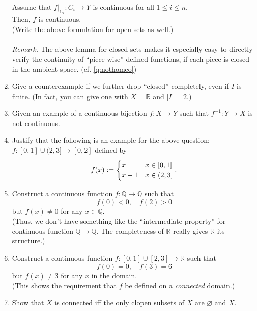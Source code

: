 \documentclass[12pt]{article}
\theoremstyle{definition}
\numberwithin{thm}{section}
\let\emptyset\varnothing
\begin{document}
\begin{enumerate}
	Assume that $f|_{C_i}:C_i \to Y$ is continuous for all $1 \le i \le n.$\\
	Then, $f$ is continuous.\\
	(Write the above formulation for open sets as well.)\\~\\
	\emph{Remark.} The above lemma for closed sets makes it especially easy to directly verify the continuity of ``piece-wise'' defined functions, if each piece is closed in the ambient space. (cf. \ref{q:nothomeo})
	\item Give a counterexample if we further drop ``closed'' completely, even if $I$ is finite. (In fact, you can give one with $X = \mathbb{R}$ and $|I| = 2.$)
	\item Given an example of a continuous bijection $f:X \to Y$ such that $f^{-1}:Y \to X$ is not continuous.
	\item \label{q:nothomeo} Justify that the following is an example for the above question:\\
	$f:[0, 1] \cup (2, 3] \to [0, 2]$ defined by
	\begin{equation*} 
		f(x) \vcentcolon= \begin{cases}
			x & x \in [0, 1]\\
			x - 1 & x \in (2, 3]
		\end{cases}.
	\end{equation*}
	\item Construct a continuous function $f:\mathbb{Q} \to \mathbb{Q}$ such that
	\begin{equation*} 
		f(0) < 0, \quad f(2) > 0
	\end{equation*}
	but $f(x) \neq 0$ for any $x \in \mathbb{Q}.$\\
	(Thus, we don't have something like the ``intermediate property'' for continuous function $\mathbb{Q} \to \mathbb{Q}.$ The completeness of $\mathbb{R}$ really gives $\mathbb{R}$ its structure.)
	\item Construct a continuous function $f:[0, 1] \cup [2, 3] \to \mathbb{R}$ such that 
	\begin{equation*} 
		f(0) = 0, \quad f(3) = 6
	\end{equation*}
	but $f(x) \neq 3$ for any $x$ in the domain.\\
	(This shows the requirement that $f$ be defined on a \emph{connected} domain.)
	\item Show that $X$ is connected iff the only clopen subsets of $X$ are $\emptyset$ and $X.$\\

\end{enumerate}
\end{document}
